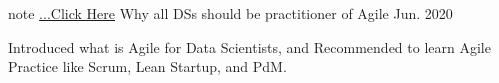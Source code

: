 

\begin{cventries}

  \cventry
    {note \href{https://note.com/87date/n/n0bd89605971c}{...Click Here}} %
    {Why all DSs should be practitioner of Agile} %
    {} %
    {Jun. 2020} %
    {
      \begin{cvitems} %
        \item {Introduced what is Agile for Data Scientists, and Recommended to learn Agile Practice like Scrum, Lean Startup, and PdM.}
      \end{cvitems}
    }

\end{cventries}
